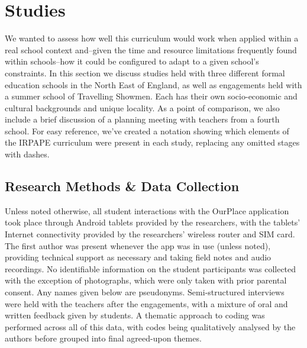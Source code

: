 \documentclass[,hyphens]{sigchi}
\begin{document}
\section{Studies}

We wanted to assess how well this curriculum would work when applied within a real school context and--given the time and resource limitations frequently found within schools--how it could be configured to adapt to a given school's constraints. In this section we discuss studies held with three different formal education schools in the North East of England, as well as engagements held with a summer school of Travelling Showmen. Each has their own socio-economic and cultural backgrounds and unique locality. As a point of comparison, we also include a brief discussion of a planning meeting with teachers from a fourth school. For easy reference, we've created a notation showing which elements of the IRPAPE curriculum were present in each study, replacing any omitted stages with dashes.

\subsection{Research Methods \& Data Collection}

Unless noted otherwise, all student interactions with the OurPlace application took place through Android tablets provided by the researchers, with the tablets' Internet connectivity provided by the researchers' wireless router and SIM card. The first author was present whenever the app was in use (unless noted), providing technical support as necessary and taking field notes and audio recordings. No identifiable information on the student participants was collected with the exception of photographs, which were only taken with prior parental consent. Any names given below are pseudonyms. Semi-structured interviews were held with the teachers after the engagements, with a mixture of oral and written feedback given by students. A thematic approach to coding was performed across all of this data, with codes being qualitatively analysed by the authors before grouped into final agreed-upon themes.
\end{document}
